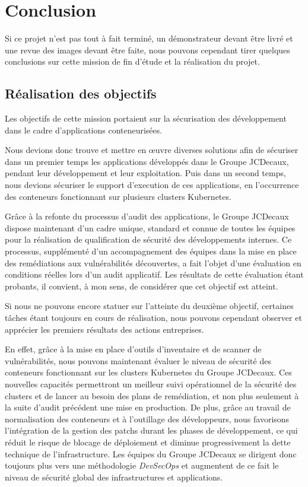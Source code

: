 \chapter{Conclusion}
Si ce projet n'est pas tout à fait terminé, un démonstrateur devant être livré et une revue des images devant être faite,
nous pouvons cependant tirer quelques conclusions sur cette mission de fin d'étude et la réalisation du projet.

\section{Réalisation des objectifs}
Les objectifs de cette mission portaient sur la sécurisation des développement dans le cadre d'applications conteneurisées.

Nous devions donc trouve et mettre en œuvre diverses solutions afin de sécuriser dans un premier temps les applications 
développés dans le Groupe JCDecaux, pendant leur développement et leur exploitation.
\newline Puis dans un second temps, nous devions sécuriser le support d'execution de ces applications, 
en l'occurrence des conteneurs fonctionnant sur plusieurs clusters Kubernetes.

Grâce à la refonte du processus d'audit des applications, le Groupe JCDecaux dispose maintenant d'un cadre unique, 
standard et connue de toutes les équipes pour la réalisation de qualification de sécurité des développements internes.
Ce processus, supplémenté d'un accompagnement des équipes dans la mise en place des remédiations aux vulnérabilités 
découvertes, a fait l'objet d'une évaluation en conditions réelles lors d'un audit applicatif.
\newline Les résultats de cette évaluation étant probants, il convient, à mon sens, de considérer que cet objectif est 
atteint.

Si nous ne pouvons encore statuer sur l'atteinte du deuxième objectif, certaines tâches étant toujours en cours de 
réalisation, nous pouvons cependant observer et apprécier les premiers résultats des actions entreprises.

En effet, grâce à la mise en place d'outils d'inventaire et de scanner de vulnérabilités, nous pouvons maintenant 
évaluer le niveau de sécurité des conteneurs fonctionnant sur les clusters Kubernetes du Groupe JCDecaux. Ces nouvelles
capacités permettront un meilleur suivi opérationnel de la sécurité des clusters et de lancer au besoin des plans de 
remédiation, et non plus seulement à la suite d'audit précédent une mise en production.
\newline De plus, grâce au travail de normalisation des conteneurs et à l'outillage des développeurs, nous favorisons 
l'intégration de la gestion des patchs durant les phases de développement, ce qui réduit le risque de blocage de déploiement
et diminue progressivement la dette technique de l'infrastructure.
\newline Les équipes du Groupe JCDecaux se dirigent donc toujours plus vers une méthodologie \emph{DevSecOps} et augmentent 
de ce fait le niveau de sécurité global des infrastructures et applications.

